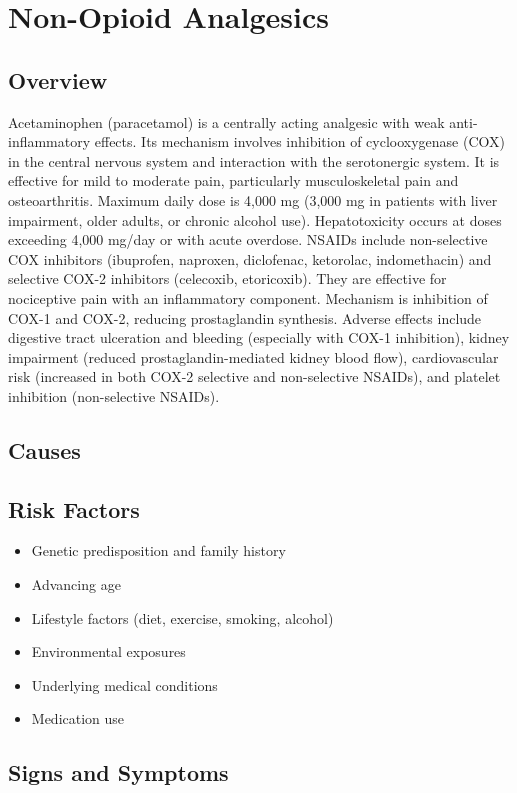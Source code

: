 \chapter{Non-Opioid Analgesics}
\label{sec:Non-Opioid Analgesics}

\section{Overview}
Acetaminophen (paracetamol) is a centrally acting analgesic with weak anti-inflammatory effects. Its mechanism involves inhibition of cyclooxygenase (COX) in the central nervous system and interaction with the serotonergic system. It is effective for mild to moderate pain, particularly musculoskeletal pain and osteoarthritis. Maximum daily dose is 4,000 mg (3,000 mg in patients with liver impairment, older adults, or chronic alcohol use). Hepatotoxicity occurs at doses exceeding 4,000 mg/day or with acute overdose. NSAIDs include non-selective COX inhibitors (ibuprofen, naproxen, diclofenac, ketorolac, indomethacin) and selective COX-2 inhibitors (celecoxib, etoricoxib). They are effective for nociceptive pain with an inflammatory component. Mechanism is inhibition of COX-1 and COX-2, reducing prostaglandin synthesis. Adverse effects include digestive tract ulceration and bleeding (especially with COX-1 inhibition), kidney impairment (reduced prostaglandin-mediated kidney blood flow), cardiovascular risk (increased in both COX-2 selective and non-selective NSAIDs), and platelet inhibition (non-selective NSAIDs).
\section{Causes}
\section{Risk Factors}

\begin{itemize}[noitemsep]
  \item Genetic predisposition and family history
  \item Advancing age
  \item Lifestyle factors (diet, exercise, smoking, alcohol)
  \item Environmental exposures
  \item Underlying medical conditions
  \item Medication use
\end{itemize}
\section{Signs and Symptoms}

